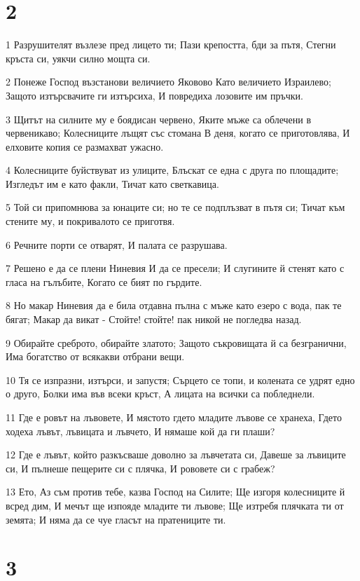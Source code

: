 \chapter{2}

\par 1 Разрушителят възлезе пред лицето ти; Пази крепостта, бди за пътя, Стегни кръста си, уякчи силно мощта си.
\par 2 Понеже Господ възстанови величието Яковово Като величието Израилево; Защото изтърсвачите ги изтърсиха, И повредиха лозовите им пръчки.
\par 3 Щитът на силните му е боядисан червено, Яките мъже са облечени в червеникаво; Колесниците лъщят със стомана В деня, когато се приготовлява, И елховите копия се размахват ужасно.
\par 4 Колесниците буйствуват из улиците, Блъскат се една с друга по площадите; Изгледът им е като факли, Тичат като светкавица.
\par 5 Той си припомнюва за юнаците си; но те се подплъзват в пътя си; Тичат към стените му, и покривалото се приготвя.
\par 6 Речните порти се отварят, И палата се разрушава.
\par 7 Решено е да се плени Ниневия И да се пресели; И слугините й стенят като с гласа на гълъбите, Когато се бият по гърдите.
\par 8 Но макар Ниневия да е била отдавна пълна с мъже като езеро с вода, пак те бягат; Макар да викат - Стойте! стойте! пак никой не погледва назад.
\par 9 Обирайте среброто, обирайте златото; Защото съкровищата й са безгранични, Има богатство от всякакви отбрани вещи.
\par 10 Тя се изпразни, изтърси, и запустя; Сърцето се топи, и колената се удрят едно о друго, Болки има във всеки кръст, А лицата на всички са побледнели.
\par 11 Где е ровът на лъвовете, И мястото гдето младите лъвове се хранеха, Гдето ходеха лъвът, лъвицата и лъвчето, И нямаше кой да ги плаши?
\par 12 Где е лъвът, който разкъсваше доволно за лъвчетата си, Давеше за лъвиците си, И пълнеше пещерите си с плячка, И рововете си с грабеж?
\par 13 Ето, Аз съм против тебе, казва Господ на Силите; Ще изгоря колесниците й всред дим, И мечът ще изпояде младите ти лъвове; Ще изтребя плячката ти от земята; И няма да се чуе гласът на пратениците ти.

\chapter{3}

